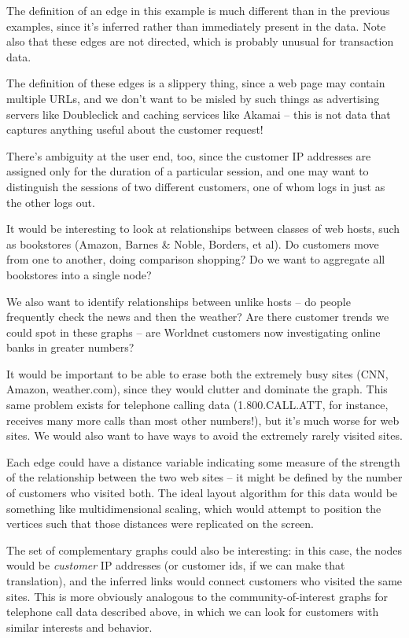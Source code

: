 \documentclass[11pt]{article}
\begin{document}
The definition of an edge in this example is much different than
in the previous examples, since it's inferred rather than
immediately present in the data.  Note also that these edges are
not directed, which is probably unusual for transaction data.

The definition of these edges is a slippery thing, since a web
page may contain multiple URLs, and we don't want to be misled by
such things as advertising servers like Doubleclick and caching
services like Akamai -- this is not data that captures anything
useful about the customer request!

There's ambiguity at the user end, too, since the customer IP
addresses are assigned only for the duration of a particular
session, and one may want to distinguish the sessions of two
different customers, one of whom logs in just as the other logs
out.

It would be interesting to look at relationships between classes
of web hosts, such as bookstores (Amazon, Barnes \& Noble, Borders,
et al).  Do customers move from one to another, doing comparison
shopping?  Do we want to aggregate all bookstores into a single
node?

We also want to identify relationships between unlike hosts -- do
people frequently check the news and then the weather?  Are there
customer trends we could spot in these graphs -- are Worldnet
customers now investigating online banks in greater numbers?

It would be important to be able to erase both the extremely busy
sites (CNN, Amazon, weather.com), since they would clutter and
dominate the graph.  This same problem exists for telephone
calling data (1.800.CALL.ATT, for instance, receives many more
calls than most other numbers!), but it's much worse for web
sites.  We would also want to have ways to avoid the extremely
rarely visited sites.

Each edge could have a distance variable indicating some measure
of the strength of the relationship between the two web sites --
it might be defined by the number of customers who visited both.
The ideal layout algorithm for this data would be something like
multidimensional scaling, which would attempt to position the
vertices such that those distances were replicated on the
screen.

The set of complementary graphs could also be interesting:  in
this case, the nodes would be {\em customer} IP addresses (or
customer ids, if we can make that translation), and the inferred
links would connect customers who visited the same sites.  This
is more obviously analogous to the community-of-interest graphs
for telephone call data described above, in which we can look for
customers with similar interests and behavior.
\end{document}
